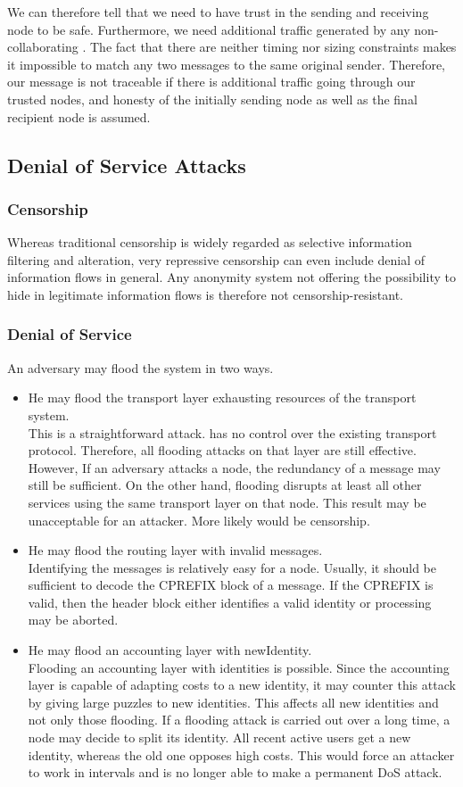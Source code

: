 We can therefore tell that we need to have trust in the sending and receiving node to be safe. Furthermore, we need additional traffic generated by any non-collaborating \VortexNode{}. The fact that there are neither timing nor sizing constraints makes it impossible to match any two messages to the same original sender. Therefore, our message is not traceable if there is additional traffic going through our trusted nodes, and honesty of the initially sending node as well as the final recipient node is assumed.

\subsection{Denial of Service Attacks}
\subsubsection{Censorship}
Whereas traditional censorship is widely regarded as selective information filtering and alteration, very repressive censorship can even include denial of information flows in general. Any anonymity system not offering the possibility to hide in legitimate information flows is therefore not censorship-resistant.

\subsubsection{Denial of Service}
An adversary may flood the system in two ways.
\begin{itemize}
	\item He may flood the transport layer exhausting resources of the transport system.\\
	This is a straightforward attack. \MessageVortex{} has no control over the existing transport protocol. Therefore, all flooding attacks on that layer are still effective. However, If an adversary attacks a node, the redundancy of a message may still be sufficient. On the other hand, flooding disrupts at least all other services using the same transport layer on that node. This result may be unacceptable for an attacker. More likely would be censorship.
	\item He may flood the routing layer with invalid messages.\\ 
	Identifying the messages is relatively easy for a node. Usually, it should be sufficient to decode the CPREFIX block of a message. If the CPREFIX is valid, then the header block either identifies a valid identity or processing may be aborted. 
	\item He may flood an accounting layer with newIdentity.\\
	Flooding an accounting layer with identities is possible. Since the accounting layer is capable of adapting costs to a new identity, it may counter this attack by giving large puzzles to new identities. This affects all new identities and not only those flooding. If a flooding attack is carried out over a long time, a node may decide to split its identity. All recent active users get a new identity, whereas the old one opposes high costs. This would force an attacker to work in intervals and is no longer able to make a permanent DoS attack.
\end{itemize}

